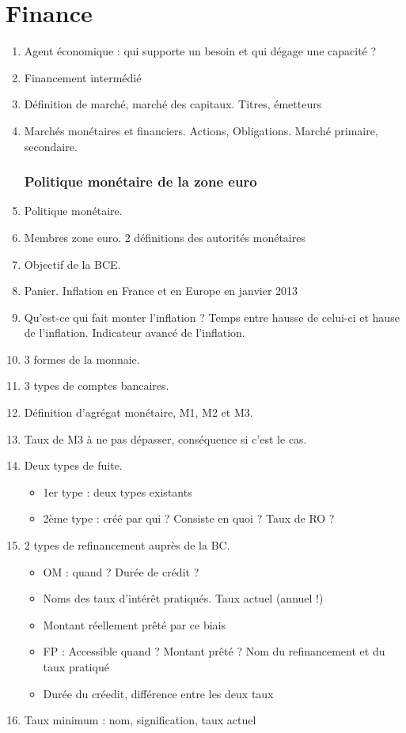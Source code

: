 \documentclass[11pt, twocolumn, landscape]{article}
\begin{document}
\part{Finance}
\begin{enumerate}
\section{Introduction}
\item Agent économique : qui supporte un besoin et qui dégage une capacité ?
\item Financement intermédié
\item Définition de marché, marché des capitaux. Titres, émetteurs
\item Marchés monétaires et financiers. Actions, Obligations. Marché primaire, secondaire.
\section{Politique monétaire de la zone euro}
\item Politique monétaire. 
\item Membres zone euro. 2 définitions des autorités monétaires
\item Objectif de la BCE.
\item Panier. Inflation en France et en Europe en janvier 2013
\item Qu'est-ce qui fait monter l'inflation ? Temps entre hausse de celui-ci et hause de l'inflation. Indicateur avancé de l'inflation.
\item 3 formes de la monnaie. 
\item 3 types de comptes bancaires. 
\item Définition d'agrégat monétaire, M1, M2 et M3. 
\item Taux de M3 à ne pas dépasser, conséquence si c'est le cas.
\item Deux types de fuite.
\begin{itemize}
	\item 1er type : deux types existants
	\item 2ème type : créé par qui ? Consiste en quoi ? Taux de RO ?
\end{itemize}
\item 2 types de refinancement auprès de la BC.
\begin{itemize}
	\item OM : quand ? Durée de crédit ? 
	\item Noms des taux d'intérêt pratiqués. Taux actuel (annuel !)
	\item Montant réellement prêté par ce biais
	\item FP : Accessible quand ? Montant prêté ? Nom du refinancement et du taux pratiqué
	\item Durée du créedit, différence entre les deux taux
\end{itemize}
\item Taux minimum : nom, signification, taux actuel

\end{enumerate}
\end{document}
